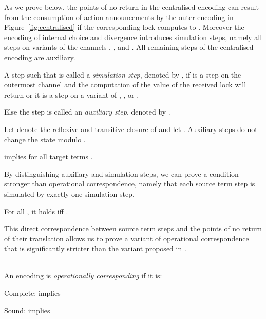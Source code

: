 \documentclass[copyright,creativecommons]{eptcs}
\begin{document}
As we prove below, the points of no return in the centralised encoding can result from the consumption of action announcements by the outer encoding in Figure~\ref{fig:centralised} if the corresponding lock computes to . Moreover the encoding of internal choice and divergence introduces simulation steps, namely all steps on variants of the channels , , and . All remaining steps of the centralised encoding are auxiliary.

\begin{definition}
	A step  such that  is called a \emph{simulation step}, denoted by , if  is a step on the outermost channel  and the computation of the value of the received lock  will return  or it is a step on a variant of , , or .
	
	Else the step  is called an \emph{auxiliary step}, denoted by .
	\label{def:auxStepsCentral}
\end{definition}

\noindent
Let  denote the reflexive and transitive closure of  and let .
Auxiliary steps do not change the state modulo .

\begin{lemma}
	 implies  for all target terms .
	\label{lem:auxStepsCentral}
\end{lemma}

By distinguishing auxiliary and simulation steps, we can prove a condition stronger than operational correspondence, namely that each source term step is simulated by exactly one simulation step.

\begin{lemma}
	For all , it holds  iff .
	\label{lem:sourceVsSimStep}
\end{lemma}

\noindent
This direct correspondence between source term steps and the points of no return of their translation allows us to prove a variant of operational correspondence that is significantly stricter than the variant proposed in \cite{gorla10}.

\begin{definition}
	\\
	An encoding  is \emph{operationally corresponding} \wrt  if it is:
	\begin{compactitem}
		\item[\; Complete:]  implies 
		\item[\; Sound:]  implies 
	\end{compactitem}
\end{definition}
\end{document}
